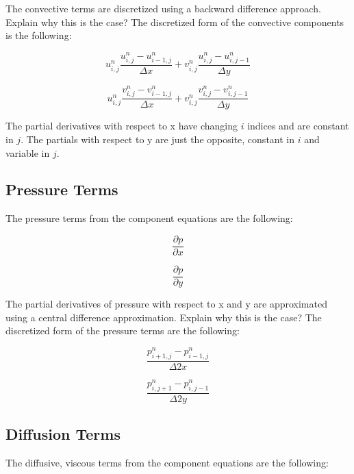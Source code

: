 \documentclass[twocolumn,12pth]{article}
\begin{document}
The convective terms are discretized using a backward difference approach.
Explain why this is the case?
The discretized form of the convective components is the following:

\begin{equation}
u_{i,j}^n\frac{u^n_{i,j} - u^n_{i-1,j}}{\Delta{x}} + v_{i,j}^n\frac{u^n_{i,j} - u^n_{i,j-1}}{\Delta{y}}
\end{equation}

\begin{equation*}
u_{i,j}^n\frac{v^n_{i,j} - v^n_{i-1,j}}{\Delta{x}} + v_{i,j}^n\frac{v^n_{i,j} - v^n_{i,j-1}}{\Delta{y}}
\end{equation*}

The partial derivatives with respect to x have changing $i$ indices and are constant in $j$.
The partials with respect to y are just the opposite, constant in $i$ and variable in $j$.

\subsection{Pressure Terms}

The pressure terms from the component equations are the following:

\begin{equation}
\frac{\partial{p}}{\partial{x}}
\end{equation}

\begin{equation*}
\frac{\partial{p}}{\partial{y}}
\end{equation*}

The partial derivatives of pressure with respect to x and y are approximated using a central difference approximation.
Explain why this is the case?
The discretized form of the pressure terms are the following:

\begin{equation}
\frac{p^n_{i+1,j} - p^n_{i-1,j}}{\Delta{2x}} 
\end{equation}

\begin{equation*}
\frac{p^n_{i,j+1} - p^n_{i,j-1}}{\Delta{2y}}
\end{equation*}

\subsection{Diffusion Terms}

The diffusive, viscous terms from the component equations are the following:
\end{document}
